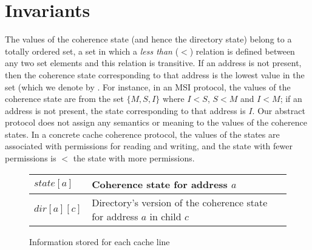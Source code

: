 \section{Invariants}
\label{sec:invariants}

\newcommand{\threeAngle}[4]{\text{$#1\langle#2,#3,#4\rangle$}}

\newcommand{\Req}[3]{\threeAngle{Req}{#1}{#2}{#3}}
\newcommand{\Resp}[3]{\threeAngle{Resp}{#1}{#2}{#3}}
\newcommand{\Inv}{\text{$Inv$\;}}
\newcommand{\Dirty}{\text{$Dirty$\;}}

The values of the coherence state (and hence the directory state) belong to a
totally ordered set, \ie a set in which a \emph{less than} ($<$) relation is
defined between any two set elements and this relation is transitive. If an
address is not present, then the coherence state corresponding to that address
is the lowest value in the set (which we denote by \Inv. For instance, in an
MSI protocol, the values of the coherence state are from the set $\{M, S, I\}$
where $I < S$, $S < M$ and $I < M$; if an address is not present, the state
corresponding to that address is $I$. Our abstract protocol does not assign any
semantics or meaning to the values of the coherence states. In a concrete cache
coherence protocol, the values of the states are associated with permissions
for reading and writing, and the state with fewer permissions is $<$ the state
with more permissions.

\begin{figure}\centering
\begin{tabularx}{\linewidth}{|l|X|}
\hline
$state[a]$ & Coherence state for address $a$\\
\hline
$dir[a][c]$ & Directory's version of the coherence state for address $a$ in child
$c$\\
\hline
\end{tabularx}
\caption{Information stored for each cache line}
\label{table:storage}
\end{figure}

